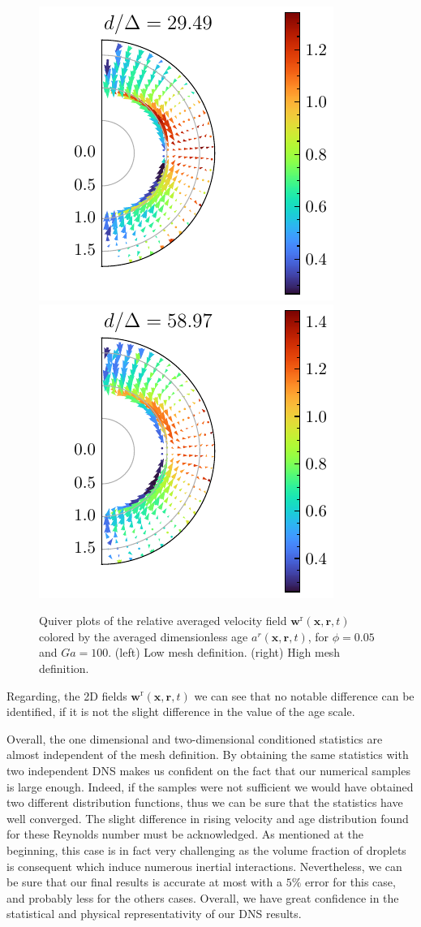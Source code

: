 \begin{figure}[h!]
    \centering
    \includegraphics[height = 0.3\textwidth]{image/HOMOGENEOUS_NEW/VAL/U_rel_ndc_25.pdf}
    \includegraphics[height = 0.3\textwidth]{image/HOMOGENEOUS_NEW/VAL/U_rel_ndc_35.pdf}
    \caption{Quiver plots of the relative averaged velocity field $\textbf{w}^\text{r}(\textbf{x},\textbf{r},t)$ colored by the averaged dimensionless age $a^r(\textbf{x},\textbf{r},t)$, for $\phi = 0.05$ and $Ga = 100$. 
    (left) Low mesh definition.
    (right) High mesh definition. 
    }
    \label{fig:velap}
\end{figure}
Regarding, the 2D fields  $\textbf{w}^\text{r}(\textbf{x},\textbf{r},t)$ we can see that no notable difference can be identified, if it is not the slight difference in the value of the age scale. 


Overall, the one dimensional and two-dimensional conditioned statistics are almost independent of the mesh definition. 
By obtaining the same statistics with two independent DNS makes us confident on the fact that our numerical samples is large enough.
Indeed, if the samples were not sufficient we would have obtained two different distribution functions, thus we can be sure that the statistics have well converged. 
The slight difference in rising velocity and age distribution found for these Reynolds number must be acknowledged.
As mentioned at the beginning, this case is in fact very challenging as the volume fraction of droplets is consequent which induce numerous inertial interactions. 
Nevertheless, we can be sure that our final results is accurate at most with a $5\%$ error for this case, and probably less for the others cases. 
Overall, we have great confidence in the statistical and physical representativity of our DNS results. 